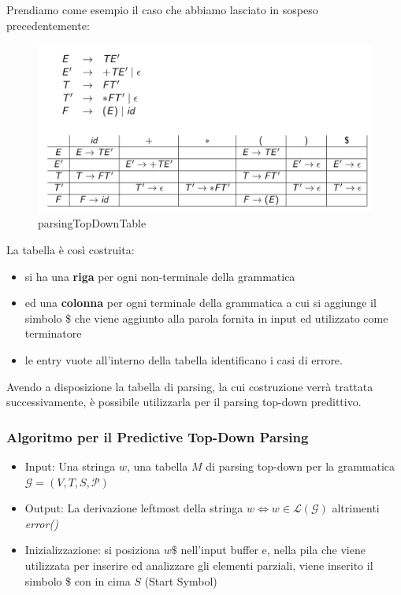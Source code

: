 \documentclass[class=book, crop=false, oneside, 12pt]{standalone}
\begin{document}
Prendiamo come esempio il caso che abbiamo lasciato in sospeso precedentemente:

\begin{figure}[h]
    \centering
    \includegraphics[width=.7\textwidth,keepaspectratio]{parsingTopDownTable.jpg}
    \caption{parsingTopDownTable}
    \label{parsingTopDownTable}
\end{figure}

La tabella è così costruita:
\begin{itemize}
    \item si ha una \textbf{riga} per ogni non-terminale della grammatica
    \item ed una \textbf{colonna} per ogni terminale della grammatica a cui si aggiunge il simbolo \$ che viene aggiunto alla parola fornita in input ed utilizzato come terminatore
    \item le entry vuote all'interno della tabella identificano i casi di errore.
\end{itemize}

Avendo a disposizione la tabella di parsing, la cui costruzione verrà trattata successivamente, è possibile utilizzarla per il parsing top-down predittivo.

\subsubsection{Algoritmo per il Predictive Top-Down Parsing}
\begin{itemize}
    \item Input: Una stringa \(w\), una tabella \(M\) di parsing top-down per la grammatica \(\mathcal{G} = (V, T, S, \mathcal{P})\)
    \item Output: La derivazione leftmost della stringa \(w \iff w \in \mathcal{L(G)}\) altrimenti \emph{error()}
    \item Inizializzazione: si posiziona \(w\$\) nell'input buffer e, nella pila che viene utilizzata per inserire ed analizzare gli elementi parziali, viene inserito il simbolo \$ con in cima \(S\) (Start Symbol)
\end{itemize}
\end{document}
